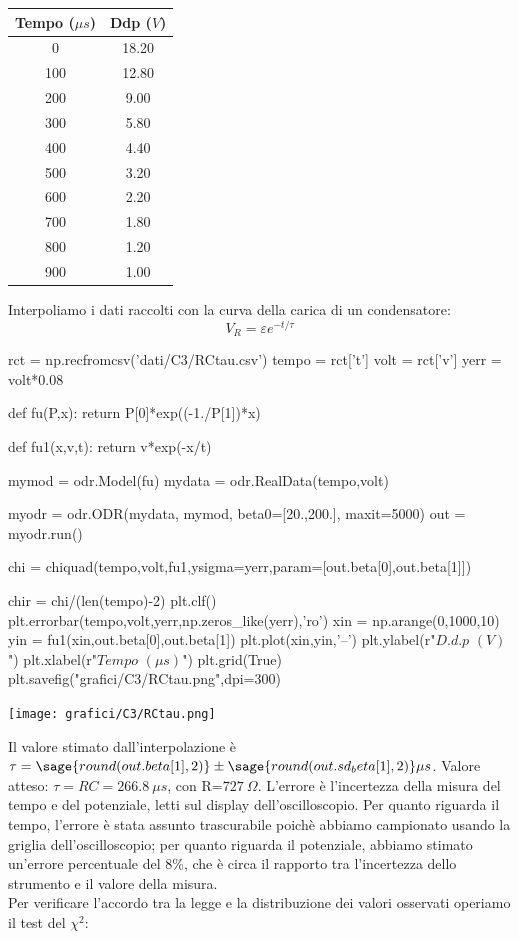 \begin{center}
\begin{tabular}{*{2}{c}}
Tempo ($\mu s$) & Ddp ($V$) \\
\midrule
0 & 18.20 \\
100 & 12.80 \\
200 & 9.00 \\
300 & 5.80 \\
400 & 4.40 \\
500 & 3.20 \\
600 & 2.20 \\
700 & 1.80 \\
800 & 1.20 \\
900 & 1.00 \\
\end{tabular}
\end{center}

Interpoliamo i dati raccolti con la curva della carica di un condensatore: 
$$V_R = \varepsilon e^{-t/\tau}$$


\begin{sagesilent}

rct = np.recfromcsv('dati/C3/RCtau.csv')
tempo = rct['t']
volt = rct['v']
yerr = volt*0.08

def fu(P,x):
    return P[0]*exp((-1./P[1])*x)
    
def fu1(x,v,t):
    return v*exp(-x/t)
    
mymod = odr.Model(fu)
mydata = odr.RealData(tempo,volt)

myodr = odr.ODR(mydata, mymod, beta0=[20.,200.], maxit=5000)
out = myodr.run()

chi = chiquad(tempo,volt,fu1,ysigma=yerr,param=[out.beta[0],out.beta[1]])

chir = chi/(len(tempo)-2)
plt.clf()
plt.errorbar(tempo,volt,yerr,np.zeros_like(yerr),'ro')
xin = np.arange(0,1000,10)
yin = fu1(xin,out.beta[0],out.beta[1])
plt.plot(xin,yin,'--')
plt.ylabel(r"$D.d.p$ $(V)$ ")
plt.xlabel(r"$Tempo$ $(\mu s)$")
plt.grid(True)
plt.savefig("grafici/C3/RCtau.png",dpi=300)

\end{sagesilent}

\begin{center}
 \texttt{[image: grafici/C3/RCtau.png]}
\end{center}


Il valore stimato dall'interpolazione è $\tau=\sage{round(out.beta[1],2)}\pm \sage{round(out.sd_beta[1],2)}\mu s$.
Valore atteso: $\tau=RC=266.8\ \mu s$, con R=$727\ \Omega$.
L'errore è l'incertezza della misura del tempo e del potenziale, letti sul display dell'oscilloscopio. Per quanto riguarda il tempo, l'errore è stata assunto trascurabile poichè abbiamo campionato usando la griglia dell'oscilloscopio; per quanto riguarda il potenziale, abbiamo stimato un'errore percentuale del 8\%, che è circa il rapporto tra l'incertezza dello strumento e il valore della misura. 
\\
Per verificare l'accordo tra la legge e la distribuzione dei valori osservati operiamo il test del $\chi^2$:


